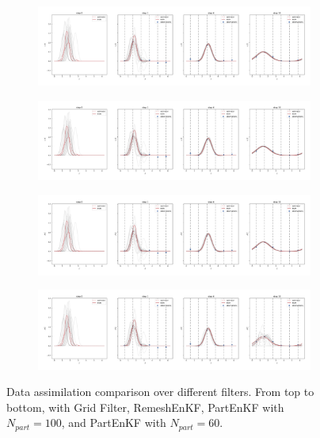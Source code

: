 \begin{figure}
	\centering
	\begin{subfigure}{\textwidth}
		\includegraphics[width=\textwidth]{images/app1d/wo_calibration/grid_euler.png}
	\end{subfigure}
	\begin{subfigure}{\textwidth}
		\includegraphics[width=\textwidth]{images/app1d/wo_calibration/remesh_EnKF.png}
	\end{subfigure}
	\begin{subfigure}{\textwidth}
		\includegraphics[width=\textwidth]{images/app1d/wo_calibration/part_enkf_30.png}
	\end{subfigure}
	\begin{subfigure}{\textwidth}
		\includegraphics[width=\textwidth]{images/app1d/wo_calibration/part_enkf_60.png}
	\end{subfigure}
	\caption{Data assimilation comparison over different filters. From top to bottom, with Grid Filter, RemeshEnKF, PartEnKF with $N_{part}=100$, and PartEnKF with $N_{part}=60$.}
\end{figure}
\newpage

